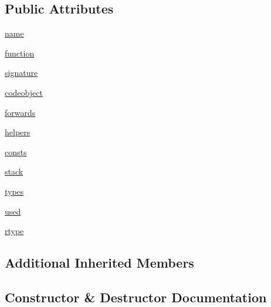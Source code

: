 \subsection*{Public Attributes}
\begin{DoxyCompactItemize}
\item 
\hyperlink{classscipy_1_1weave_1_1bytecodecompiler_1_1CXXCoder_a7cbd78dfc745c6c864d2e3513bc05abc}{name}
\item 
\hyperlink{classscipy_1_1weave_1_1bytecodecompiler_1_1CXXCoder_af73169c8fad00b056f2e7cce96499436}{function}
\item 
\hyperlink{classscipy_1_1weave_1_1bytecodecompiler_1_1CXXCoder_a0b4e15eb84d1d3d4f5044eb26cc8bb29}{signature}
\item 
\hyperlink{classscipy_1_1weave_1_1bytecodecompiler_1_1CXXCoder_a2ac3d5d7375771fe7151ccdfebe528de}{codeobject}
\item 
\hyperlink{classscipy_1_1weave_1_1bytecodecompiler_1_1CXXCoder_a60b9fa86bd23a6f2b330cd170b5a2ab6}{forwards}
\item 
\hyperlink{classscipy_1_1weave_1_1bytecodecompiler_1_1CXXCoder_a8163b4c9ba61c951e474a6950b1a300b}{helpers}
\item 
\hyperlink{classscipy_1_1weave_1_1bytecodecompiler_1_1CXXCoder_aef5fa1b24e7a50c26f4f582faf4631f3}{consts}
\item 
\hyperlink{classscipy_1_1weave_1_1bytecodecompiler_1_1CXXCoder_ad80c18314a0e727f63688760b693fd3d}{stack}
\item 
\hyperlink{classscipy_1_1weave_1_1bytecodecompiler_1_1CXXCoder_a6a59cddfe264ec81b69bb071ca22335a}{types}
\item 
\hyperlink{classscipy_1_1weave_1_1bytecodecompiler_1_1CXXCoder_a34bba759e7e36f360df945d4a8d0b9e9}{used}
\item 
\hyperlink{classscipy_1_1weave_1_1bytecodecompiler_1_1CXXCoder_a8e25489fc137725a12e0e1b94a622435}{rtype}
\end{DoxyCompactItemize}
\subsection*{Additional Inherited Members}


\subsection{Constructor \& Destructor Documentation}
\hypertarget{classscipy_1_1weave_1_1bytecodecompiler_1_1CXXCoder_af96e7466a2bcb5cac7604a694123b7e1}{}
